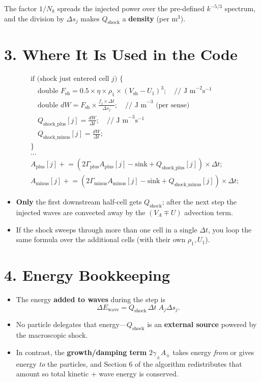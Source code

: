 \noindent
The factor $1/N_k$ spreads the injected power over the pre-defined $k^{-5/3}$ spectrum, and the division by $\Delta s_j$ makes $Q_{\text{shock}}$ a \textbf{density} (per m$^3$).

\section*{3. Where It Is Used in the Code}

\begin{align*}
&\text{if (shock just entered cell } j\text{) \{} \\
&\quad \text{double } F_{\text{sh}} = 0.5 \times \eta \times \rho_1 \times (V_{\text{sh}} - U_1)^3; \quad \text{// J m}^{-2} \text{s}^{-1} \\
&\quad \text{double } dW = F_{\text{sh}} \times \frac{f_j \times \Delta t}{\Delta s_j}; \quad \text{// J m}^{-3} \text{ (per sense)} \\
&\quad Q_{\text{shock\_plus}}[j] = \frac{dW}{\Delta t}; \quad \text{// J m}^{-3} \text{s}^{-1} \\
&\quad Q_{\text{shock\_minus}}[j] = \frac{dW}{\Delta t}; \\
&\text{\}} \\
&\text{...} \\
&A_{\text{plus}}[j] \mathrel{+}= \left( 2\Gamma_{\text{plus}} A_{\text{plus}}[j] - \text{sink} + Q_{\text{shock\_plus}}[j] \right) \times \Delta t; \\
&A_{\text{minus}}[j] \mathrel{+}= \left( 2\Gamma_{\text{minus}} A_{\text{minus}}[j] - \text{sink} + Q_{\text{shock\_minus}}[j] \right) \times \Delta t;
\end{align*}

\begin{itemize}
\item \textbf{Only} the first downstream half-cell gets $Q_{\text{shock}}$; after the next step the injected waves are convected away by the $(V_A \mp U)$ advection term.
\item If the shock sweeps through more than one cell in a single $\Delta t$, you loop the same formula over the additional cells (with their own $\rho_1, U_1$).
\end{itemize}

\section*{4. Energy Bookkeeping}

\begin{itemize}
\item The energy \textbf{added to waves} during the step is
\[
\Delta E_{\text{wave}} = Q_{\text{shock}}\,\Delta t\;A_j\Delta s_j.
\]
\item No particle delegates that energy—$Q_{\text{shock}}$ is an \textbf{external source} powered by the macroscopic shock.
\item In contrast, the \textbf{growth/damping term} $2\gamma_\pm A_\pm$ takes energy \emph{from} or gives energy \emph{to} the particles, and Section 6 of the algorithm redistributes that amount so total kinetic + wave energy is conserved.
\end{itemize}

